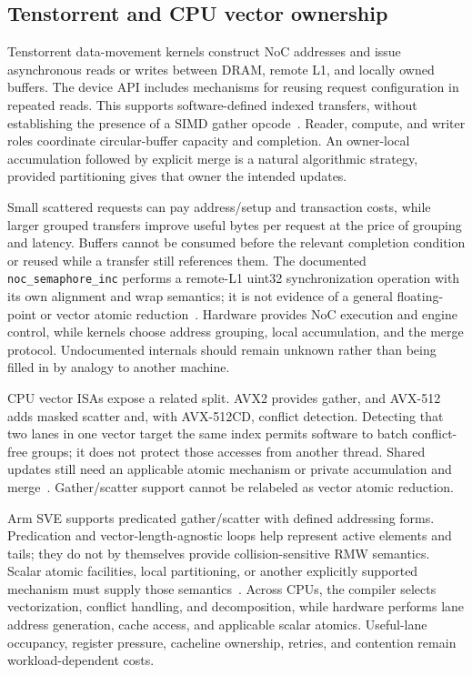 \subsection{Tenstorrent and CPU vector ownership}

Tenstorrent data-movement kernels construct NoC addresses and issue asynchronous reads or writes between DRAM, remote L1, and locally owned buffers. The device API includes mechanisms for reusing request configuration in repeated reads. This supports software-defined indexed transfers, without establishing the presence of a SIMD gather opcode~\citep{u004_tt_movement}. Reader, compute, and writer roles coordinate circular-buffer capacity and completion. An owner-local accumulation followed by explicit merge is a natural algorithmic strategy, provided partitioning gives that owner the intended updates.

Small scattered requests can pay address/setup and transaction costs, while larger grouped transfers improve useful bytes per request at the price of grouping and latency. Buffers cannot be consumed before the relevant completion condition or reused while a transfer still references them. The documented \texttt{noc\_semaphore\_inc} performs a remote-L1 uint32 synchronization operation with its own alignment and wrap semantics; it is not evidence of a general floating-point or vector atomic reduction~\citep{u004_tt_semaphore}. Hardware provides NoC execution and engine control, while kernels choose address grouping, local accumulation, and the merge protocol. Undocumented internals should remain unknown rather than being filled in by analogy to another machine.

CPU vector ISAs expose a related split. AVX2 provides gather, and AVX-512 adds masked scatter and, with AVX-512CD, conflict detection. Detecting that two lanes in one vector target the same index permits software to batch conflict-free groups; it does not protect those accesses from another thread. Shared updates still need an applicable atomic mechanism or private accumulation and merge~\citep{u004_intel_conflict}. Gather/scatter support cannot be relabeled as vector atomic reduction.

Arm SVE supports predicated gather/scatter with defined addressing forms. Predication and vector-length-agnostic loops help represent active elements and tails; they do not by themselves provide collision-sensitive RMW semantics. Scalar atomic facilities, local partitioning, or another explicitly supported mechanism must supply those semantics~\citep{u004_arm_acle}. Across CPUs, the compiler selects vectorization, conflict handling, and decomposition, while hardware performs lane address generation, cache access, and applicable scalar atomics. Useful-lane occupancy, register pressure, cacheline ownership, retries, and contention remain workload-dependent costs.

